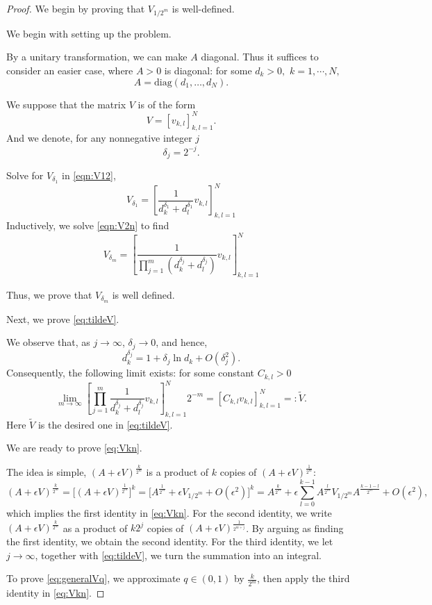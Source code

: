 \documentclass{article}
\numberwithin{equation}{section}
\begin{document}
\begin{proof}
We begin by proving that $V_{1/2^m}$ is well-defined.

We begin with setting up the problem.

By a unitary transformation, we can make $A$ diagonal. Thus it suffices to consider an easier case, where $A > 0$ is diagonal: for some $d_k>0,$ $k=1,\cdots,N,$ $$A = \text{diag}(d_1, \dots, d_N).$$

We suppose that the matrix $V$ is of the form $$V = [v_{k,l}]_{k,l=1}^N.$$
And we denote, for any nonnegative integer $j$
$$\delta_{j}=2^{-j}.$$

Solve for $V_{\delta_1}$ in \eqref{eqn:V12},
\[
V_{\delta_1} = \left[ \frac{1}{d_k^{\delta_1} + d_l^{\delta_1 }} v_{k,l} \right]_{k,l=1}^N
\]
Inductively, we solve \eqref{eqn:V2n} to find
\[
V_{\delta_m } = \left[ \frac{1}{\prod_{j=1}^m (d_k^{\delta_j } + d_l^{\delta_j })} v_{k,l} \right]_{k,l=1}^N
\]

Thus, we prove that $V_{\delta_m}$ is well defined.

Next, we prove \eqref{eq:tildeV}.

We observe that, as $j \to \infty$, $\delta_j\rightarrow 0$, and hence,
\[
d_k^{\delta_j } = 1 + \delta_j \ln d_k + O(\delta_j^2 ).
\]
Consequently, the following limit exists: for some constant $C_{k,l} > 0$
\[
\lim_{m \to \infty} \left[ \prod_{j=1}^m \frac{1}{d_k^{\delta_j } + d_l^{\delta_j }} v_{k,l}\right]_{k,l=1}^{N} 2^{-m} =\left[ C_{k,l}v_{k,l}\right]_{k,l=1}^{N}=:\tilde{V}.
\] Here $\tilde{V}$ is the desired one in \eqref{eq:tildeV}.

We are ready to prove \eqref{eq:Vkn}.

The idea is simple, $(A + \epsilon V)^{\frac{k}{2^m}}$ is a product of $k$ copies of $(A + \epsilon V)^{\frac{1}{2^m}}$: $$(A + \epsilon V)^{\frac{k}{2^m}}=\Big[(A + \epsilon V)^{\frac{1}{2^m}}\Big]^k=\Big[A^{\frac{1}{2^m}}+\epsilon V_{1/2^m}+O(\epsilon^2)\Big]^k=A^{\frac{k}{2^m}} +\epsilon\sum_{l=0}^{k-1} A^{\frac{l}{2^m}} V_{1/2^{m}} A^{\frac{k-1-l}{2^m}}+O(\epsilon^2),$$
which implies the first identity in \eqref{eq:Vkn}. For the second identity, we write $(A + \epsilon V)^{\frac{k}{2^m}}$ as a product of $k 2^{j}$ copies of $(A + \epsilon V)^{\frac{1}{2^{m+j}}}$. By arguing as finding the first identity, we obtain the second identity. For the third identity, we let $j\rightarrow \infty$, together with \eqref{eq:tildeV}, we turn the summation into an integral.

To prove \eqref{eq:generalVq}, we approximate $q\in (0,1)$ by $\frac{k}{2^m}$, then apply the third identity in \eqref{eq:Vkn}. 


\end{proof}
\end{document}
